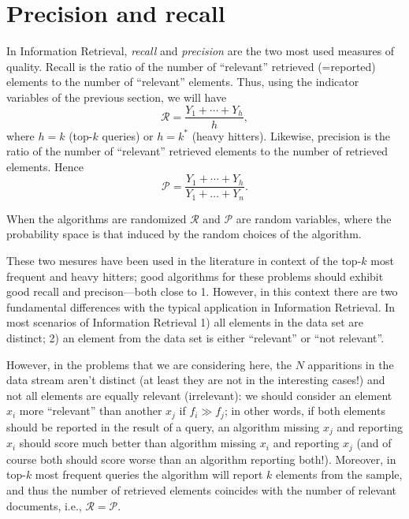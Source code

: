 \documentclass{article}
\begin{document}
\section{Precision and recall}
In Information Retrieval, \emph{recall} and \emph{precision} are the
two most used measures of quality. Recall is the ratio
of the number of ``relevant'' retrieved (=reported) elements to the
number of ``relevant'' elements. Thus, using the indicator variables
of the previous section, we will have
\begin{equation}
\mathcal{R} = \frac{Y_1+\cdots+Y_h}{h},
\label{eq:unweighted-recall}
\end{equation}
where $h=k$ (top-$k$ queries) or $h=k^\ast$ (heavy hitters).
Likewise, precision is the ratio
of the number of ``relevant'' retrieved elements to the number
of retrieved elements. Hence
\begin{equation}
\mathcal{P} = \frac{Y_1+\cdots+Y_h}{Y_1+\ldots+Y_n}.
\label{eq:unweighted-precision}
\end{equation}

When the algorithms are randomized $\mathcal{R}$ and $\mathcal{P}$ are random variables, where
the probability space is that induced by the random choices of the algorithm.

These two mesures have been used in the literature in context of the
top-$k$ most frequent and heavy hitters; good algorithms for these
problems should exhibit good recall and precison---both close to 1.
However, in this context there are two fundamental differences with the
typical application in Information Retrieval. In most scenarios of
Information Retrieval 1) all elements
in the data set are distinct; 2) an element from the data set
is either ``relevant'' or ``not relevant''.

However, in the problems that we are considering here, the $N$
apparitions in the data stream aren't distinct (at least they are not
in the interesting cases!) and not all elements are equally relevant (irrelevant):
we should consider an element $x_i$
more ``relevant'' than another $x_j$ if $f_i\gg f_j$; in other words, if both
elements should be reported in the result of a query, an algorithm missing
$x_j$ and reporting $x_i$ should score much better than algorithm
missing $x_i$ and reporting $x_j$ (and of course both should score
worse than an algorithm reporting both!).
Moreover, in top-$k$ most frequent queries the algorithm will report $k$ elements from the sample, and thus
the number of retrieved elements coincides with the number of relevant documents, i.e.,
$\mathcal{R}=\mathcal{P}$.
\end{document}
